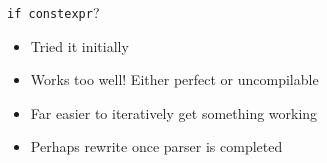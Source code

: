 \documentclass[xcolor=dvipsnames]{beamer}
\begin{document}
\begin{frame}[fragile]{\texttt{if constexpr}?}
  \begin{itemize}
  \item Tried it initially \vspace{5mm}
  \item Works too well! Either perfect or uncompilable \vspace{5mm}
  \item Far easier to iteratively get something working \vspace{5mm}
  \item Perhaps rewrite once parser is completed \vspace{5mm}
  \end{itemize}
\end{frame}


\begin{frame}[plain]
  \titlepage
\end{frame}
\end{document}
